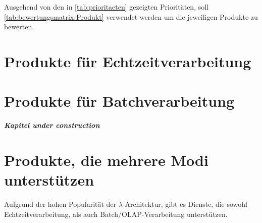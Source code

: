 

Ausgehend von den in \autoref{tab:prioritaeten} gezeigten Prioritäten, soll \autoref{tab:bewertungsmatrix-Produkt} verwendet werden um die jeweiligen Produkte zu bewerten.



\section{Produkte für Echtzeitverarbeitung}\label{produkte:echtzeit}



\section{Produkte für Batchverarbeitung}

\textbf{\textit{Kapitel under construction}} 



\section{Produkte, die mehrere Modi unterstützen}
Aufgrund der hohen Popularität der $\lambda$-Architektur, gibt es Dienste, die sowohl Echtzeitverarbeitung, als auch Batch/\ac{OLAP}-Verarbeitung unterstützen.
